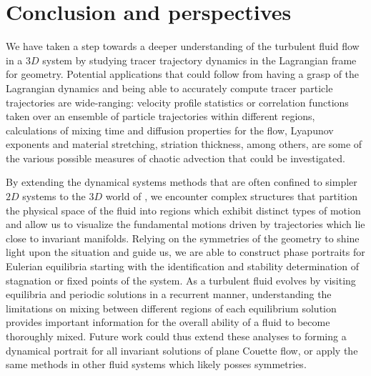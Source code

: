 
\section{Conclusion and perspectives} %
\label{s:summary}

We have taken a step towards a deeper understanding of the  turbulent 
fluid flow in a $3D$ system  by studying 
tracer trajectory dynamics in the Lagrangian frame for {\pC} geometry. Potential 
applications that could follow from having a grasp of the Lagrangian 
dynamics and being able to accurately compute tracer particle 
trajectories are wide-ranging: velocity profile statistics or correlation 
functions taken over an ensemble of particle trajectories within 
different regions, calculations of mixing time and diffusion properties 
for the flow, Lyapunov exponents and material stretching, striation 
thickness, among others, are some of the various possible measures of 
chaotic advection that could be investigated.  

By extending the dynamical systems methods that are often confined to 
simpler $2D$ systems to the $3D$ world of {\pCf}, we encounter complex 
structures that partition the physical space of the fluid into regions 
which exhibit distinct types of motion and allow us to visualize the 
fundamental motions driven by trajectories which lie close to invariant 
manifolds. Relying on the symmetries of the geometry to shine light upon 
the situation and guide us, we are able to construct phase portraits for 
{\pC} Eulerian equilibria starting with the identification and stability 
determination of stagnation or fixed points of the system. As a turbulent 
fluid evolves by visiting equilibria and periodic solutions in a 
recurrent manner, understanding the limitations on mixing between 
different regions of each equilibrium solution provides important 
information for the overall ability of a fluid to become thoroughly 
mixed.  Future work could thus extend these analyses to forming a 
dynamical portrait for all invariant solutions of plane Couette flow, or 
apply the same methods in other fluid systems which likely posses 
symmetries. 

